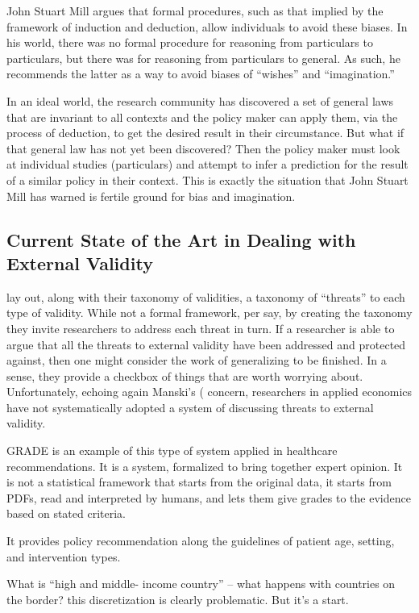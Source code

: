 \documentclass[a4paper,12pt]{article}
\begin{document}
John Stuart Mill argues that formal procedures, such as that implied by the framework of induction and deduction, allow individuals to avoid these biases. In his world, there was no formal procedure for reasoning from particulars to particulars, but there was for reasoning from particulars to general. As such, he recommends the latter as a way to avoid biases of ``wishes'' and ``imagination.''

In an ideal world, the research community has discovered a set of general laws that are invariant to all contexts and the policy maker can apply them, via the process of deduction, to get the desired result in their circumstance. But what if that general law has not yet been discovered? Then the policy maker must look at individual studies (particulars) and attempt to infer a prediction for the result of a similar policy in their context. This is exactly the situation that John Stuart Mill has warned is fertile ground for bias and imagination.


\subsection*{Current State of the Art in Dealing with External Validity }

\cite{Shadish2002} lay out, along with their taxonomy of validities, a taxonomy of ``threats'' to each type of validity. While not a formal framework, per say, by creating the taxonomy they invite researchers to address each threat in turn. If a researcher is able to argue that all the threats to external validity have been addressed and protected against, then one might consider the work of generalizing to be finished. In a sense, they provide a checkbox of things that are worth worrying about. Unfortunately, echoing again Manski's (\parencite*{Manski2008} concern, researchers in applied economics have not systematically adopted a system of discussing threats to external validity.


GRADE is an example of this type of system applied in healthcare recommendations. It is a system, formalized to bring together expert opinion. It is not a statistical framework that starts from the original data, it starts from PDFs, read and interpreted by humans, and lets them give grades to the evidence based on stated criteria. 

It provides policy recommendation along the guidelines of patient age, setting, and intervention types. 

What is ``high and middle- income country'' -- what happens with countries on the border? this discretization is clearly problematic. But it's a start. 
\end{document}
